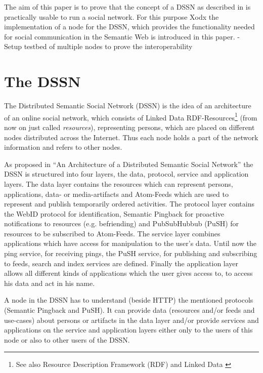 \documentclass{llncs}
\begin{document}
The aim of this paper is to prove that the concept of a DSSN as described in \cite{tramp-s-2012--a} is practically usable to run a social network.
For this purpose Xodx the implementation of a node for the DSSN, which provides the functionality needed for social communication in the Semantic Web is introduced in this paper.
- Setup testbed of multiple nodes to prove the interoperability


\section{The DSSN}
The Distributed Semantic Social Network (DSSN) is the idea of an architecture of an online social network, which consists of Linked Data RDF-Resources\footnote{See also Resource Description Framework (RDF) \cite{lassila-o-1999--a} and Linked Data \cite{bernerslee-t-2009--}} (from now on just called \emph{resources}), representing persons, which are placed on different nodes distributed across the Internet.
Thus each node holds a part of the network information and refers to other nodes.

As proposed in “An Architecture of a Distributed Semantic Social Network” \cite{tramp-s-2012--a} the DSSN is structured into four layers, the data, protocol, service and application layers.
The data layer contains the resources which can represent persons, applications, data- or media-artifacts and Atom-Feeds which are used to represent and publish temporarily ordered activities.
The protocol layer contains the WebID protocol for identification, Semantic Pingback \cite{tramp-s-2010--b} for proactive notifications to resources (e.g. befriending) and PubSubHubbub (PuSH) for resources to be subscribed to Atom-Feeds.
The service layer combines applications which have access for manipulation to the user's data. Until now the ping service, for receiving pings, the PuSH service, for publishing and subscribing to feeds, search and index services are defined.
Finally the application layer allows all different kinds of applications which the user gives access to, to access his data and act in his name.

A node in the DSSN has to understand (beside HTTP) the mentioned protocols (Semantic Pingback and PuSH).
It can provide data (resources and/or feeds and use-cases) about persons or artifacts in the data layer and/or provide services and applications on the service and application layers either only to the users of this node or also to other users of the DSSN.
\end{document}
